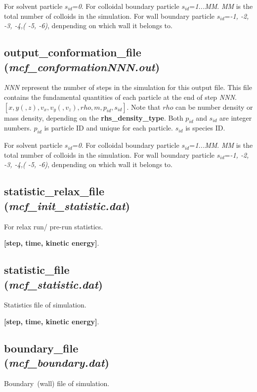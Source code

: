 \documentclass[a4paper,10pt]{article}
\begin{document}
For solvent particle \textbf{$s_{id}$}=\textit{0}.
For colloidal boundary particle \textbf{$s_{id}$}=\textit{1...\textit{MM}}.
\textit{MM} is the total number of colloids
in the simulation.
For wall boundary particle \textbf{$s_{id}$}=\textit{-1, -2, -3, -4,( -5, -6)},
denpending on which wall it belongs to.

\subsection{\textbf{output\_conformation\_file}\\
(\textit{mcf\_conformationNNN.out})}
\textit{NNN} represent the number of steps in the simulation for this output file.
This file contains the fundamental quantities of each particle
at the end of step \textit{NNN}.
\textbf{$[x, y(, z), v_x, v_y(, v_z), rho, m, p_{id}, s_{id}]$}.
Note that \textbf{$rho$} can be number density or mass density,
depending on the \textbf{rhs\_density\_type}.
Both \textbf{$p_{id}$} and \textbf{$s_{id}$} are integer numbers.
\textbf{$p_{id}$} is particle ID and
unique for each particle.
\textbf{$s_{id}$} is species ID.

For solvent particle \textbf{$s_{id}$}=\textit{0}.
For colloidal boundary particle \textbf{$s_{id}$}=\textit{1...\textit{MM}}.
\textit{MM} is the total number of colloids
in the simulation.
For wall boundary particle \textbf{$s_{id}$}=\textit{-1, -2, -3, -4,( -5, -6)},
denpending on which wall it belongs to.

\subsection{\textbf{statistic\_relax\_file}\\
(\textit{mcf\_init\_statistic.dat})}
For relax run/ pre-run statistics.

\textbf{[step, time, kinetic energy]}.

\subsection{\textbf{statistic\_file}\\
(\textit{mcf\_statistic.dat})}
Statistics file of simulation.

\textbf{[step, time, kinetic energy]}.

\subsection{\textbf{boundary\_file}\\
(\textit{mcf\_boundary.dat})}
Boundary~(wall) file of simulation.
\end{document}
